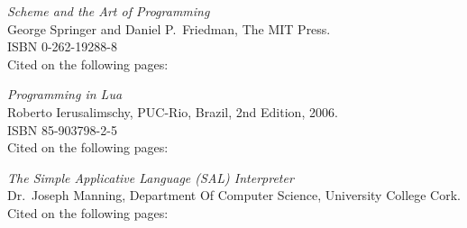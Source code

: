 \begin{thebibliography}{9}

  \emph{Scheme and the Art of Programming}\\
  George Springer and Daniel P.\ Friedman,
  The MIT Press.\\
  ISBN 0-262-19288-8\\
  Cited on the following pages: 

  \emph{Programming in Lua}\\
  Roberto Ierusalimschy,
  PUC-Rio, Brazil,
  2nd Edition,
  2006.\\
  ISBN 85-903798-2-5\\
  Cited on the following pages: 
  
  \emph{The Simple Applicative Language (SAL) Interpreter}\\
  Dr.\ Joseph Manning,
  Department Of Computer Science,
  University College Cork.\\
  Cited on the following pages: 
  
\end{thebibliography}
